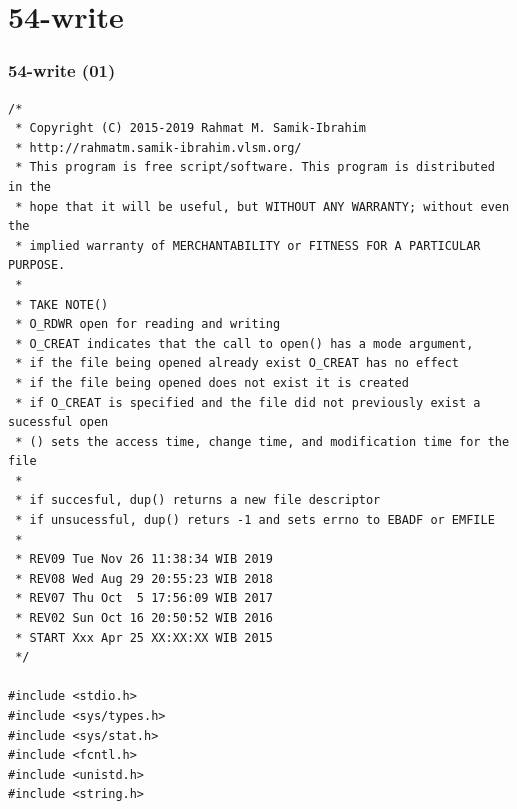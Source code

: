 \documentclass[aspectratio=169, xcolor=table, notheorems, hyperref={pdfpagelabels=false}]{beamer}
\begin{document}
\section{54-write}
\begin{frame}[fragile]
\frametitle{54-write (01)}
\begin{lstlisting}[basicstyle=\ttfamily\tiny]
/*
 * Copyright (C) 2015-2019 Rahmat M. Samik-Ibrahim
 * http://rahmatm.samik-ibrahim.vlsm.org/
 * This program is free script/software. This program is distributed in the 
 * hope that it will be useful, but WITHOUT ANY WARRANTY; without even the 
 * implied warranty of MERCHANTABILITY or FITNESS FOR A PARTICULAR PURPOSE.
 *
 * TAKE NOTE()
 * O_RDWR open for reading and writing
 * O_CREAT indicates that the call to open() has a mode argument,
 * if the file being opened already exist O_CREAT has no effect
 * if the file being opened does not exist it is created
 * if O_CREAT is specified and the file did not previously exist a sucessful open
 * () sets the access time, change time, and modification time for the file
 *
 * if succesful, dup() returns a new file descriptor
 * if unsucessful, dup() returs -1 and sets errno to EBADF or EMFILE
 *
 * REV09 Tue Nov 26 11:38:34 WIB 2019
 * REV08 Wed Aug 29 20:55:23 WIB 2018
 * REV07 Thu Oct  5 17:56:09 WIB 2017
 * REV02 Sun Oct 16 20:50:52 WIB 2016
 * START Xxx Apr 25 XX:XX:XX WIB 2015
 */

#include <stdio.h>
#include <sys/types.h>
#include <sys/stat.h>
#include <fcntl.h>
#include <unistd.h>
#include <string.h>

\end{lstlisting}
\end{frame}
\end{document}
